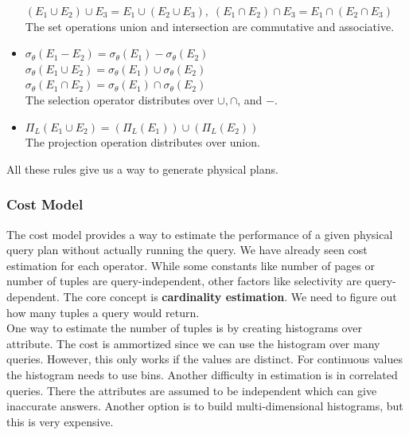 \begin{itemize}
$(E_1 \cup E_2) \cup E_3 = E_1 \cup (E_2 \cup E_3), \; (E_1 \cap E_2) \cap E_3 = E_1 \cap (E_2 \cap E_3)$\\
The set operations union and intersection are commutative and associative.
\item $\sigma_\theta(E_1 - E_2) = \sigma_\theta(E_1) - \sigma_\theta(E_2)$\\
$\sigma_\theta(E_1 \cup E_2) = \sigma_\theta(E_1) \cup \sigma_\theta(E_2)$\\
$\sigma_\theta(E_1 \cap E_2) = \sigma_\theta(E_1) \cap \sigma_\theta(E_2)$\\
The selection operator distributes over $\cup, \cap$, and $-$.
\item $\Pi_L(E_1 \cup E_2) = (\Pi_L(E_1)) \cup (\Pi_L(E_2))$\\
The projection operation distributes over union.
\end{itemize}
All these rules give us a way to generate physical plans.

\subsubsection{Cost Model}
The cost model provides a way to estimate the performance of a given physical query plan without actually running the query. We have already seen cost estimation for each operator. While some constants like number of pages or number of tuples are query-independent, other factors like selectivity are query-dependent. The core concept is \textbf{cardinality estimation}. We need to figure out how many tuples a query would return.\\
One way to estimate the number of tuples is by creating histograms over attribute. The cost is ammortized since we can use the histogram over many queries. However, this only works if the values are distinct. For continuous values the histogram needs to use bins. Another difficulty in estimation is in correlated queries. There the attributes are assumed to be independent which can give inaccurate answers. Another option is to build multi-dimensional histograms, but this is very expensive.

